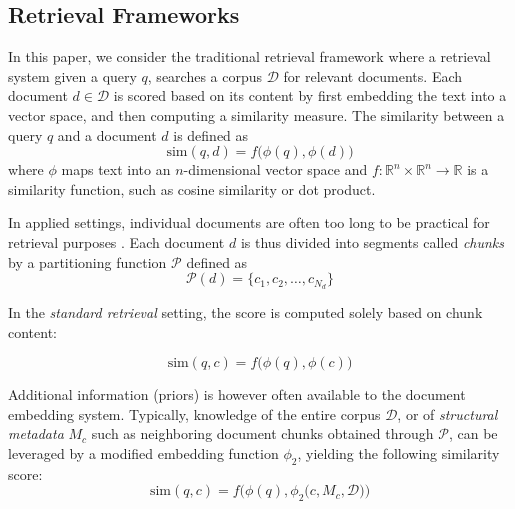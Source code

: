 \subsection{Retrieval Frameworks}
In this paper, we consider the traditional retrieval framework where a retrieval system given a query \(q\), searches a corpus \(\mathcal{D}\) for relevant documents. Each document \(d \in \mathcal{D}\) is scored based on its content by first embedding the text into a vector space, and then computing a similarity measure. The similarity between a query \(q\) and a document \(d\) is defined as
\begin{equation*}
\text{sim}(q, d) = f\big(\phi(q), \phi(d)\big)
\end{equation*}
where \(\phi\) maps text into an \(n\)-dimensional vector space and \(f: \mathbb{R}^n \times \mathbb{R}^n \to \mathbb{R}\) is a similarity function, such as cosine similarity or dot product.

In applied settings, individual documents are often too long to be practical for retrieval purposes . %
Each document \(d\) is thus divided into segments called \emph{chunks} by a partitioning function \(\mathcal{P}\) defined as
\begin{equation*}
\mathcal{P}(d) = \{c_1, c_2, \dots, c_{N_d}\}%
\end{equation*}



In the \emph{standard retrieval} setting, the score is computed solely based on chunk content:

\begin{equation*}
\text{sim}(q, c) = f\big(\phi(q), \phi(c)\big)
\end{equation*}

 Additional information (priors) is however often available to the document embedding system. Typically, knowledge of the entire corpus $\mathcal{D}$, or of \emph{structural metadata} \(M_c\) such as neighboring document chunks obtained through \(\mathcal{P}\), can be leveraged by a modified embedding function \(\phi_2\), yielding the following similarity score:
\begin{equation*}
\text{sim}(q, c) = f\Big(\phi(q), \phi_2\big(c, M_c, \mathcal{D}\big)\Big)
\end{equation*}

